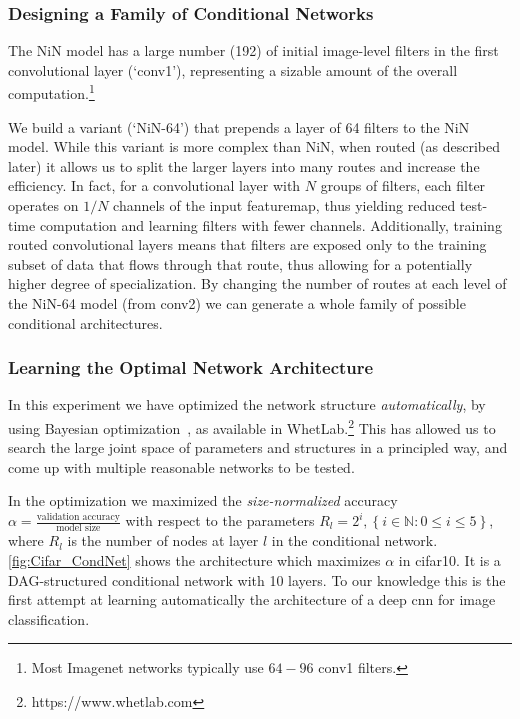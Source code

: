 \documentclass[thesis]{subfiles}
\begin{document}
	\subsubsection{Designing a Family of Conditional Networks}
	The NiN model has a large number (192) of initial image-level filters in the first convolutional layer (`conv1'), 
	representing a sizable amount of the overall computation.\footnote{Most Imagenet networks typically use $64-96$ conv1 filters.}
	
	We build a variant (`NiN-64') that prepends a layer of 64 filters to the NiN model.
	While this variant is more complex than NiN, when routed (as described later) it allows us 
	to split the larger layers into many routes and increase the efficiency.
	In fact, for a convolutional layer with $N$ groups of filters, each filter operates on $1/N$ channels of the input \gls{featuremap}, thus yielding reduced test-time computation and learning filters with fewer channels. 
	Additionally, training routed convolutional layers means that filters are exposed only to the training subset of data that flows through that route, thus allowing for a potentially higher degree of specialization.
	By changing the number of routes at each level of the NiN-64 model (from conv2) we can 
	generate a whole family of possible conditional architectures. 
	
	\subsubsection{Learning the Optimal Network Architecture}
	In this experiment we have optimized the network structure {\em automatically}, 
	by using Bayesian optimization~\citep{Snoek2012}, as available in WhetLab.\footnote{https://www.whetlab.com} 
	This has allowed us to search the large joint space of parameters and structures in a principled way, 
	and come up with multiple reasonable networks to be tested. 
	
	In the optimization we maximized the {\em size-normalized} accuracy $\alpha =\frac{\textrm{validation accuracy}}{\textrm{model size}}$ with respect to the parameters $R_l = 2^i, \left\{i\in \mathbb{N} : 0 \le i \le 5\right\}$, where $R_l$ is the number of nodes at layer $l$ in the conditional network. 
	\cref{fig:Cifar_CondNet} shows the architecture which maximizes $\alpha$ in \gls{cifar10}. 
	It is a DAG-structured conditional network with 10 layers.
	To our knowledge this is the first attempt at learning automatically the architecture of a deep \gls{cnn} for image classification.
	
\end{document}
